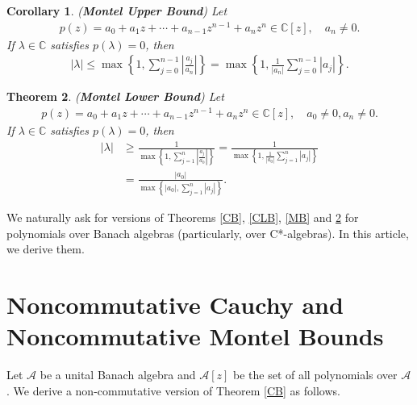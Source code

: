 \documentclass{amsart}
\newtheorem{theorem}{Theorem}[section]
\newtheorem{corollary}[theorem] {Corollary}
\begin{document}
\begin{corollary} \cite{HIRSTMACEY, RAHMANSCHMEISSER, MARDEN}
(\textbf{Montel Upper Bound}) Let 
\begin{align*}
	p(z)=a_0+a_1z+\cdots+a_{n-1}z^{n-1}+a_nz^n\in \mathbb{C}[z], \quad a_n \neq 0.
\end{align*}
If $\lambda \in \mathbb{C}$ satisfies $p(\lambda)=0$, then 
\begin{align*}
	|\lambda|\leq \max\left\{1, \sum_{j=0}^{n-1}\left|\frac{a_j}{a_n}\right|\right\}=\max\left\{1,\frac{1}{|a_n|} \sum_{j=0}^{n-1}|a_j|\right\}.
\end{align*}	
\end{corollary}
\begin{theorem} \label{MLB}\cite{HIRSTMACEY, RAHMANSCHMEISSER, MARDEN}
	(\textbf{Montel Lower Bound}) Let 
	\begin{align*}
		p(z)=a_0+a_1z+\cdots+a_{n-1}z^{n-1}+a_nz^n\in \mathbb{C}[z], \quad a_0\neq 0, a_n \neq 0.
	\end{align*}
	If $\lambda \in \mathbb{C}$ satisfies $p(\lambda)=0$, then 
	\begin{align*}
			|\lambda|&\geq \frac{1}{\max\left\{1, \sum_{j=1}^{n}\left|\frac{a_j}{a_0}\right|\right\}}=\frac{1}{\max\left\{1,\frac{1}{|a_0|} \sum_{j=1}^{n}|a_j|\right\}}\\
			&=\frac{|a_0|}{\max\left\{|a_0|, \sum_{j=1}^{n}\left|a_j\right|\right\}}.
	\end{align*}
\end{theorem}
We naturally ask for versions of Theorems \ref{CB},  \ref{CLB}, \ref{MB} and \ref{MLB} for polynomials over Banach algebras (particularly, over C*-algebras).  In this article, we derive them.











\section{Noncommutative Cauchy and Noncommutative Montel Bounds}
Let $\mathcal{A}$ be a unital Banach algebra and $\mathcal{A}[z]$ be the set of all polynomials over $\mathcal{A}$. 
We derive a non-commutative version of Theorem \ref{CB} as follows.
\end{document}
